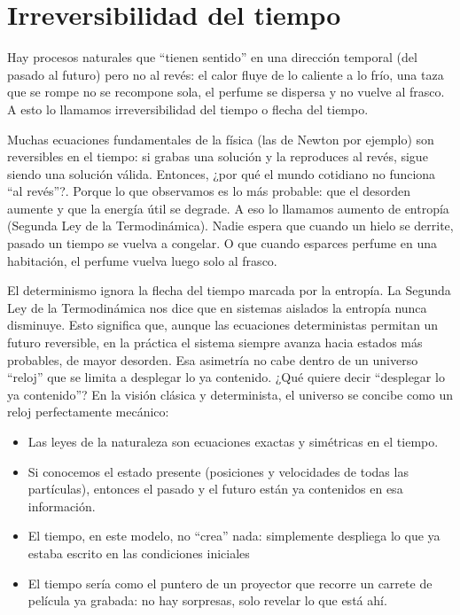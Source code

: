 \documentclass[
  10pt,
  a4paper,
  DIV=11,
  numbers=noendperiod,
  open=any]{scrreprt}
\providecommand{\tightlist}{%
  \setlength{\itemsep}{0pt}\setlength{\parskip}{0pt}}
\numberwithin{equation}{chapter}
\numberwithin{equation}{section}
\renewcommand{\[}{\begin{equation}}
\renewcommand{\]}{\end{equation}}
\begin{document}
\section{Irreversibilidad del tiempo}\label{irreversibilidad-del-tiempo}

Hay procesos naturales que ``tienen sentido'' en una dirección temporal
(del pasado al futuro) pero no al revés: el calor fluye de lo caliente a
lo frío, una taza que se rompe no se recompone sola, el perfume se
dispersa y no vuelve al frasco. A esto lo llamamos irreversibilidad del
tiempo o flecha del tiempo.

Muchas ecuaciones fundamentales de la física (las de Newton por ejemplo)
son reversibles en el tiempo: si grabas una solución y la reproduces al
revés, sigue siendo una solución válida. Entonces, ¿por qué el mundo
cotidiano no funciona ``al revés''?. Porque lo que observamos es lo más
probable: que el desorden aumente y que la energía útil se degrade. A
eso lo llamamos aumento de entropía (Segunda Ley de la Termodinámica).
Nadie espera que cuando un hielo se derrite, pasado un tiempo se vuelva
a congelar. O que cuando esparces perfume en una habitación, el perfume
vuelva luego solo al frasco.

El determinismo ignora la flecha del tiempo marcada por la entropía. La
Segunda Ley de la Termodinámica nos dice que en sistemas aislados la
entropía nunca disminuye. Esto significa que, aunque las ecuaciones
deterministas permitan un futuro reversible, en la práctica el sistema
siempre avanza hacia estados más probables, de mayor desorden. Esa
asimetría no cabe dentro de un universo ``reloj'' que se limita a
desplegar lo ya contenido. ¿Qué quiere decir ``desplegar lo ya
contenido''? En la visión clásica y determinista, el universo se concibe
como un reloj perfectamente mecánico:

\begin{itemize}
\tightlist
\item
  Las leyes de la naturaleza son ecuaciones exactas y simétricas en el
  tiempo.
\item
  Si conocemos el estado presente (posiciones y velocidades de todas las
  partículas), entonces el pasado y el futuro están ya contenidos en esa
  información.
\item
  El tiempo, en este modelo, no ``crea'' nada: simplemente despliega lo
  que ya estaba escrito en las condiciones iniciales
\item
  El tiempo sería como el puntero de un proyector que recorre un carrete
  de película ya grabada: no hay sorpresas, solo revelar lo que está
  ahí.
\end{itemize}
\end{document}

